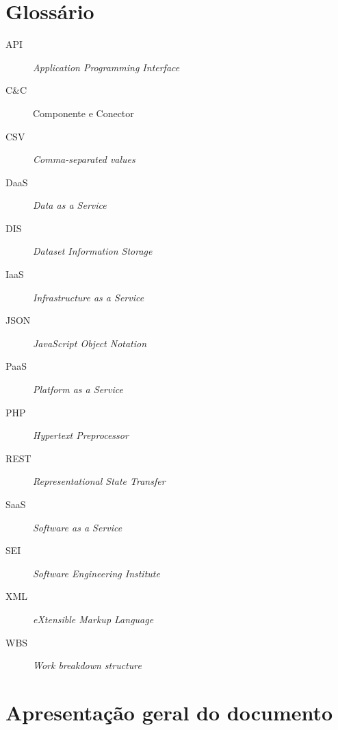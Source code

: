 \documentclass[11pt,a4paper]{article}
\begin{document}
\section*{Glossário}
\begin{description}
\item[API] \textit{Application Programming Interface}
\item[C\&C] Componente e Conector
\item[CSV] \textit{Comma-separated values}
\item[DaaS] \textit{Data as a Service}
\item[DIS] \textit{Dataset Information Storage}
\item[IaaS] \textit{Infrastructure as a Service}
\item[JSON] \textit{JavaScript Object Notation}
\item[PaaS]\textit{Platform as a Service}
\item[PHP]\textit{Hypertext Preprocessor}
\item[REST]\textit{Representational State Transfer }
\item[SaaS] \textit{Software as a Service}
\item[SEI] \textit{Software Engineering Institute}
\item[XML] \textit{eXtensible Markup Language}
\item[WBS] \textit{Work breakdown structure}

\end{description}
\newpage



\section{Apresentação geral do documento}
\end{document}
